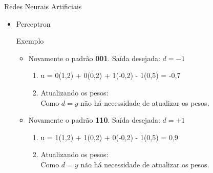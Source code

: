 \documentclass{libs/ufc_format}
\begin{document}
\begin{frame}{Redes Neurais Artificiais}
    \begin{itemize}
        \item Perceptron\\
        \begin{exampleblock}{Exemplo}
            \begin{itemize}
                \justifying
                \item Novamente o padrão \textbf{001}. Saída desejada: $d = -1$
                    \begin{enumerate}
                        \item<2-> u = \alert<3>{0}(\alert<4>{1,2}) + \alert<3>{0}(\alert<4>{0,2}) + \alert<3>{1}(\alert<4>{-0,2}) \alert<3>{- 1}(\alert<4>{0,5}) = -0,7\\
                        \item<5-> Atualizando os pesos:\\
                        Como $d = y$ não há necessidade de atualizar os pesos.
                    \end{enumerate}
                \item<6-> Novamente o padrão \textbf{110}. Saída desejada: $d = +1$
                    \begin{enumerate}
                        \item<7-> u = \alert<8>{1}(\alert<9>{1,2}) + \alert<8>{1}(\alert<9>{0,2}) + \alert<8>{0}(\alert<9>-0,2) \alert<8>{- 1}(\alert<9>{0,5}) = 0,9\\
                        \item<10> Atualizando os pesos:\\
                        Como $d = y$ não há necessidade de atualizar os pesos.
                    \end{enumerate}
            \end{itemize}
        \end{exampleblock}
    \end{itemize}
\end{frame}
\end{document}
